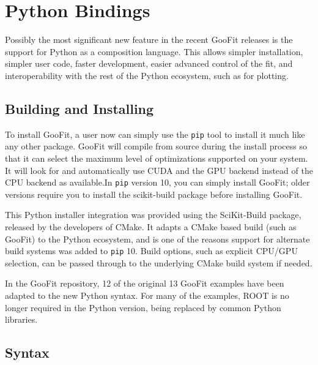 \documentclass{webofc}
\begin{document}
\section{Python Bindings}
\label{sec-py}

Possibly the most significant new feature in the recent GooFit releases is the support for Python as a composition language. This allows simpler installation, simpler user code, faster development, easier advanced control of the fit, and interoperability with the rest of the Python ecosystem, such as for plotting.

\subsection{Building and Installing}

To install GooFit, a user now can simply use the \texttt{pip} tool to install it much like any other package. GooFit will compile from source during the install process so that it can select the maximum level of optimizations supported on your system. It will look for and automatically use CUDA and the GPU backend instead of the CPU backend as available.In \texttt{pip} version 10, you can simply install GooFit; older versions require you to install the scikit-build  package before installing GooFit.

This Python installer integration was provided using the SciKit-Build package, released by the developers of CMake. It adapts a CMake based build (such as GooFit) to the Python ecosystem, and is one of the reasons support for alternate build systems was added to \texttt{pip} 10. Build options, such as explicit CPU/GPU selection, can be passed through to the underlying CMake build system if needed.

In the GooFit repository, 12 of the original 13 GooFit examples have been  adapted to the new Python syntax. For many of the examples, ROOT is no longer required in the Python version, being replaced by common Python libraries.

\subsection{Syntax}
\end{document}
